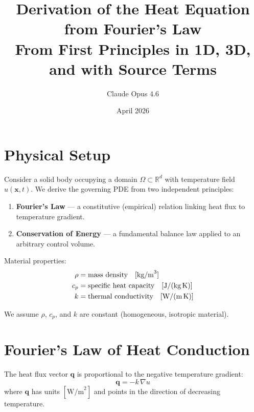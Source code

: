 \documentclass[11pt]{article}
\title{Derivation of the Heat Equation from Fourier's Law\\[6pt]
\large From First Principles in 1D, 3D, and with Source Terms}
\author{Claude Opus 4.6}
\date{April 2026}
\begin{document}
\maketitle

\section{Physical Setup}

Consider a solid body occupying a domain $\Omega \subset \mathbb{R}^d$ with temperature field $u(\mathbf{x}, t)$.
We derive the governing PDE from two independent principles:

\begin{enumerate}
  \item \textbf{Fourier's Law} --- a constitutive (empirical) relation linking heat flux to temperature gradient.
  \item \textbf{Conservation of Energy} --- a fundamental balance law applied to an arbitrary control volume.
\end{enumerate}

Material properties:
\begin{align}
  \rho &= \text{mass density} \quad [\text{kg/m}^3] \\
  c_p &= \text{specific heat capacity} \quad [\text{J/(kg\,K)}] \\
  k &= \text{thermal conductivity} \quad [\text{W/(m\,K)}]
\end{align}

We assume $\rho$, $c_p$, and $k$ are constant (homogeneous, isotropic material).

\section{Fourier's Law of Heat Conduction}

\begin{tcolorbox}[colback=blue!5, colframe=blue!50!black, title=Fourier's Law (Constitutive Relation)]
The heat flux vector $\mathbf{q}$ is proportional to the negative temperature gradient:
\begin{equation}
  \boxed{\mathbf{q} = -k\,\nabla u}
  \label{eq:fourier}
\end{equation}
where $\mathbf{q}$ has units $[\text{W/m}^2]$ and points in the direction of decreasing temperature.
\end{tcolorbox}
\end{document}
